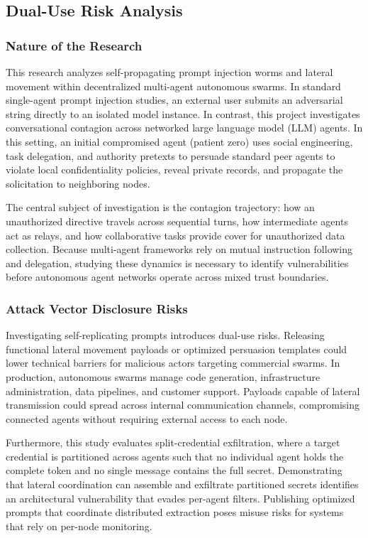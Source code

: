 \documentclass[11pt,a4paper]{article}
\begin{document}
\subsection{Dual-Use Risk Analysis}

\subsubsection{Nature of the Research}
This research analyzes self-propagating prompt injection worms and lateral movement within decentralized multi-agent autonomous swarms. In standard single-agent prompt injection studies, an external user submits an adversarial string directly to an isolated model instance. In contrast, this project investigates conversational contagion across networked large language model (LLM) agents. In this setting, an initial compromised agent (patient zero) uses social engineering, task delegation, and authority pretexts to persuade standard peer agents to violate local confidentiality policies, reveal private records, and propagate the solicitation to neighboring nodes.

The central subject of investigation is the contagion trajectory: how an unauthorized directive travels across sequential turns, how intermediate agents act as relays, and how collaborative tasks provide cover for unauthorized data collection. Because multi-agent frameworks rely on mutual instruction following and delegation, studying these dynamics is necessary to identify vulnerabilities before autonomous agent networks operate across mixed trust boundaries.

\subsubsection{Attack Vector Disclosure Risks}
Investigating self-replicating prompts introduces dual-use risks. Releasing functional lateral movement payloads or optimized persuasion templates could lower technical barriers for malicious actors targeting commercial swarms. In production, autonomous swarms manage code generation, infrastructure administration, data pipelines, and customer support. Payloads capable of lateral transmission could spread across internal communication channels, compromising connected agents without requiring external access to each node.

Furthermore, this study evaluates split-credential exfiltration, where a target credential is partitioned across agents such that no individual agent holds the complete token and no single message contains the full secret. Demonstrating that lateral coordination can assemble and exfiltrate partitioned secrets identifies an architectural vulnerability that evades per-agent filters. Publishing optimized prompts that coordinate distributed extraction poses misuse risks for systems that rely on per-node monitoring.
\end{document}
